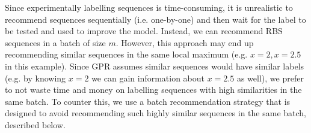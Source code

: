 \documentclass{scrartcl}[2013/05/29]%
\begin{document}
Since experimentally labelling sequences is time-consuming, it is unrealistic to recommend sequences sequentially (i.e. one-by-one) and then wait for the label to be tested and used to improve the model.
Instead, we can recommend RBS sequences in a batch of size $m$.
However, this approach may end up recommending similar sequences in the same local maximum (e.g. $x = 2, x =2.5$ in this example). 
Since GPR assumes similar sequences would have similar labels (e.g. by knowing $x=2$ we can gain information about $x=2.5$ as well), we prefer to not waste time and money on labelling sequences with high similarities in the same batch.
To counter this, we use a batch recommendation strategy that is designed to avoid recommending such highly similar sequences in the same batch, described below. \\

\end{document}
